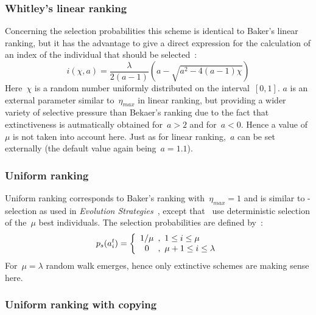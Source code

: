 \subsubsection{Whitley's linear ranking}

Concerning the selection probabilities this scheme is identical to
Baker's linear ranking, but it has the advantage to
give a direct expression for the calculation of an index of the 
individual that should be selected~\cite{Whi89}:
%
\begin{equation}
	i(\chi,a) = 	\frac{\lambda}{2(a-1)}
			\left(a - \sqrt{a^2 - 4(a-1)\chi} \right)
\end{equation}
%
Here~$\chi$ is a random number uniformly distributed on the interval~$[0,1]$.
$a$ is an external parameter similar to~$\eta_{max}$ in linear ranking,
but providing a wider variety of selective pressure than Bekaer's ranking
due to the fact that extinctiveness is autmatically obtained for~$a > 2$
and for~$a < 0$.
Hence a value of~$\mu$ is not taken into account here.
Just as for linear ranking,~$a$ can be set externally (the default value 
again being~$a = 1.1$).

\subsubsection{Uniform ranking}

Uniform ranking corresponds to Baker's ranking with~$\eta_{max} = 1$
and is similar to \cSelml-selection as used in 
{\em Evolution Strategies\/}~\cite{Rec73,Schw77,Schw81}, except that
\ESs\ use deterministic selection of the~$\mu$ best individuals.
The selection probabilities are defined by~\cite{Schw81,HB91}:
%
\begin{equation}
	p_s(a^t_i) = \left\{
	\begin{array}{c@{\hspace{0.5em},\hspace{0.5em}}l}
		1 / \mu		& 1 \leq i \leq \mu		\\
		0		& \mu+1 \leq i \leq \lambda	\\
	\end{array} \right.%
\end{equation}
%
For~$\mu = \lambda$ random walk emerges, hence only extinctive schemes
are making sense here.

\subsubsection{Uniform ranking with copying}

